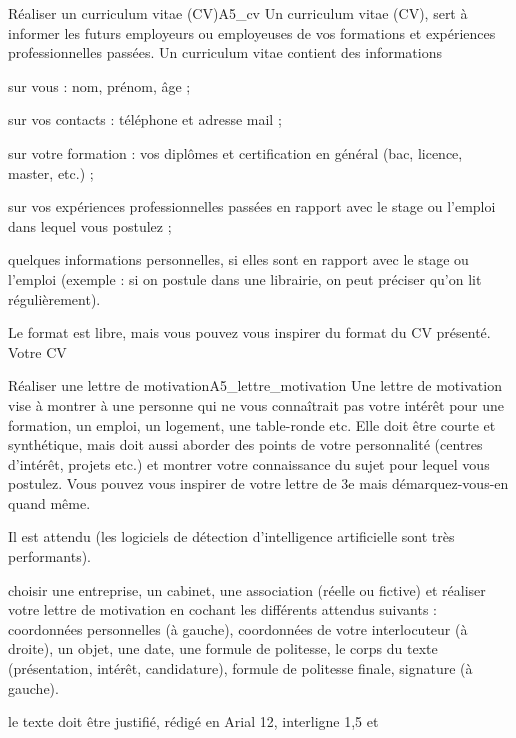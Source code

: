 \begin{doc}{Réaliser un curriculum vitae (CV)}{A5_cv}
  Un curriculum vitae (CV), sert à informer les futurs employeurs ou employeuses de vos formations et expériences professionnelles passées. 
  Un curriculum vitae contient des informations 
  \begin{listePoints}
    \item sur vous : nom, prénom, âge ;
    \item sur vos contacts : téléphone et adresse mail ;
    \item sur votre formation : vos diplômes et certification en général (bac, licence, master, etc.) ;
    \item sur vos expériences professionnelles passées en rapport avec le stage ou l'emploi dans lequel vous postulez ;
    \item quelques informations personnelles, si elles sont en rapport avec le stage ou l'emploi (exemple : si on postule dans une librairie, on peut préciser qu'on lit régulièrement).
  \end{listePoints}
  Le format est libre, mais vous pouvez vous inspirer du format du CV présenté. Votre CV 
\end{doc}

\begin{doc}{Réaliser une lettre de motivation}{A5_lettre_motivation}
  Une lettre de motivation vise à montrer à une personne qui ne vous connaîtrait pas votre intérêt pour une formation, un emploi, un logement, une table-ronde etc. Elle doit être courte et synthétique, mais doit aussi aborder des points de votre personnalité (centres d’intérêt, projets etc.) et montrer votre connaissance du sujet pour lequel vous postulez. Vous pouvez vous inspirer de votre lettre de 3e mais démarquez-vous-en quand même.
  
  Il est attendu  (les logiciels de détection d’intelligence artificielle sont très performants).
  \begin{listePoints}
    \item {} choisir une entreprise, un cabinet, une association (réelle ou fictive) et réaliser votre lettre de motivation en cochant les différents attendus suivants : coordonnées personnelles (à gauche), coordonnées de votre interlocuteur (à droite), un objet, une date, une formule de politesse, le corps du texte (présentation, intérêt, candidature), formule de politesse finale, signature (à gauche).
    \item {} le texte doit être justifié, rédigé en Arial 12, interligne 1,5 et  
  \end{listePoints}
\end{doc}

